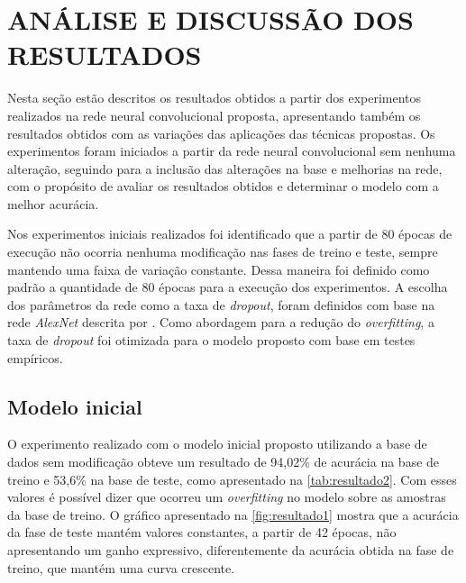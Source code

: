 
\chapter{ANÁLISE E DISCUSSÃO DOS RESULTADOS}

\label{chap:resultados}

Nesta seção estão descritos os resultados obtidos a partir dos experimentos realizados na rede neural convolucional proposta, apresentando também os resultados obtidos com as variações das aplicações das técnicas propostas.
 Os experimentos foram iniciados a partir da rede neural convolucional sem nenhuma alteração, seguindo para a inclusão das alterações na base e melhorias na rede, com o propósito de avaliar os resultados obtidos e determinar o modelo com a melhor acurácia.


\par Nos experimentos iniciais realizados foi identificado que a partir de 80 épocas de execução não ocorria nenhuma modificação nas fases de treino e teste, sempre mantendo uma faixa de variação constante. Dessa maneira foi definido como padrão a quantidade de 80 épocas para a execução dos experimentos. A escolha dos parâmetros da rede como a taxa de \textit{dropout}, foram definidos com base na rede \textit{AlexNet} descrita por . Como abordagem para a redução do \textit{overfitting}, a taxa de \textit{dropout} foi otimizada para o modelo proposto com base em testes empíricos.


\section{Modelo inicial}
O experimento realizado com o modelo inicial proposto utilizando a base de dados sem modificação obteve um resultado de 94,02\% de acurácia na base de treino e 53,6\% na base de teste, como apresentado na \autoref{tab:resultado2}. Com esses valores é possível dizer que ocorreu um \textit{overfitting} no modelo sobre as amostras da base de treino. O gráfico apresentado na \autoref{fig:resultado1} mostra que a acurácia da fase de teste mantém valores constantes, a partir de 42 épocas, não apresentando um ganho expressivo, diferentemente da acurácia obtida na fase de treino, que mantém uma curva crescente.

